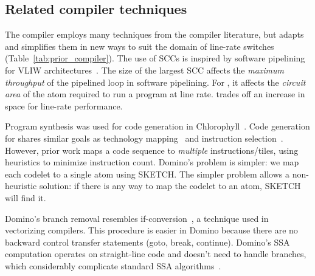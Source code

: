 \subsection{Related compiler techniques}
\label{ss:related_compiler}

The \pktlanguage compiler employs many techniques from the compiler literature,
but adapts and simplifies them in new ways to suit the domain of line-rate
switches (Table~\ref{tab:prior_compiler}). The use of SCCs is inspired by
software pipelining for VLIW architectures~\cite{software_pipelining, rau}. The size
of the largest SCC affects the {\em maximum throughput} of the pipelined loop
in software pipelining. For \pktlanguage, it affects the {\em circuit area} of
the atom required to run a program at line rate. \pktlanguage trades off an
increase in space for line-rate performance.

Program synthesis was used for code generation in
Chlorophyll~\cite{chlorophyll}.  Code generation for \pktlanguage shares
similar goals as technology mapping~\cite{micheli, flowmap, spectransform} and
instruction selection~\cite{muchnik}.  However, prior work maps a code sequence
to \textit{multiple} instructions/tiles, using heuristics to minimize
instruction count. Domino's problem is simpler: we map each codelet to a single
atom using SKETCH.  The simpler problem allows a non-heuristic solution: if
there is any way to map the codelet to an atom, SKETCH will find it.

Domino's branch removal resembles if-conversion~\cite{if_conversion}, a
technique used in vectorizing compilers. This procedure is easier in Domino
because there are no backward control transfer statements (goto, break,
continue). Domino's SSA computation operates on straight-line code and doesn't
need to handle branches, which considerably complicate standard SSA
algorithms~\cite{ssa}.


